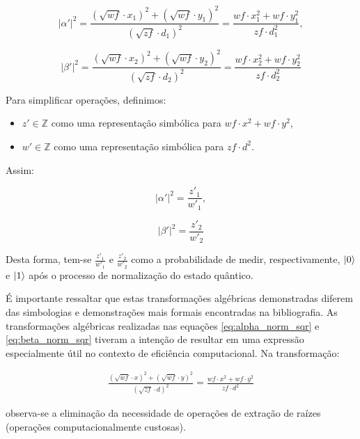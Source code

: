 \documentclass[12pt, a4paper]{article}
\begin{document}
\begin{equation}
|\alpha'|^2=\frac{\left(\sqrt{wf}\cdot x_1\right)^2+\left(\sqrt{wf}\cdot y_1\right)^2}{\left(\sqrt{zf}\cdot d_1\right)^2}=\frac{wf\cdot x_1^2+wf\cdot y_1^2}{zf\cdot d_1^2},
\label{eq:alpha_norm_sqr}
\end{equation}

\begin{equation}
|\beta'|^2=\frac{\left(\sqrt{wf}\cdot x_2\right)^2+\left(\sqrt{wf}\cdot y_2\right)^2}{\left(\sqrt{zf}\cdot d_2\right)^2}=\frac{wf\cdot x_2^2+wf\cdot y_2^2}{zf\cdot d_2^2}
\label{eq:beta_norm_sqr}
\end{equation}

Para simplificar operações, definimos:
\begin{itemize}
\item \(z' \in \mathbb{Z}\) como uma representação simbólica para \(wf\cdot x^2+wf\cdot y^2\),
\item \(w' \in \mathbb{Z}\) como uma representação simbólica para \(zf\cdot d^2\).
\end{itemize}

Assim:

\begin{equation}
|\alpha'|^2=\frac{z'_1}{w'_1},
\label{eq:alpha_norm_sqr_final}
\end{equation}

\begin{equation}
|\beta'|^2=\frac{z'_2}{w'_2}
\label{eq:beta_norm_sqr_final}
\end{equation}

Desta forma, tem-se \(\frac{z'_1}{w'_1}\) e \(\frac{z'_2}{w'_2}\) como a probabilidade de medir, respectivamente, \(\ket{0}\) e \(\ket{1}\) após o processo de normalização do estado quântico.

É importante ressaltar que estas transformações algébricas demonstradas diferem das simbologias e demonstrações mais formais encontradas na bibliografia. As transformações algébricas realizadas nas equações \ref{eq:alpha_norm_sqr} e \ref{eq:beta_norm_sqr} tiveram a intenção de resultar em uma expressão especialmente útil no contexto de eficiência computacional.
Na transformação:

\begin{align*}
\frac{\left(\sqrt{wf}\cdot x\right)^2+\left(\sqrt{wf}\cdot y\right)^2}{\left(\sqrt{zf}\cdot d\right)^2}=\frac{wf\cdot x^2+wf\cdot y^2}{zf\cdot d^2}
\end{align*}

observa-se a eliminação da necessidade de operações de extração de raízes (operações computacionalmente custosas).
\end{document}

